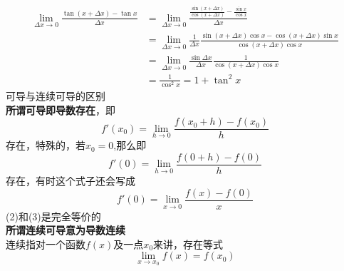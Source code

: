 \documentclass[UTF8]{ctexart}
\begin{document}
\begin{equation*}
    \begin{split}
        \lim_{\Delta x \to 0} \frac{\tan({x+\Delta x})-\tan{x}}{\Delta x}&=\lim_{\Delta x \to 0}\frac{\frac{\sin({x+\Delta x})}{\cos({x+\Delta x})}-\frac{\sin x }{\cos x} }{\Delta x} \\
        &=\lim_{\Delta x \to 0}\frac{1}{\Delta x}\frac{\sin({x+\Delta x})\cos{x}-\cos({x+\Delta x})\sin{x}}{\cos({x+\Delta x})\cos{x}}\\
        &=\lim_{\Delta x \to 0}\frac{\sin{\Delta x}}{\Delta x}\frac{1}{\cos({x+\Delta x})\cos x}\\
        &=\frac{1}{\cos^2 x}=1+\tan^2 x
    \end{split}
\end{equation*}
可导与连续可导的区别\\
\textbf{所谓可导即导数存在}，即
\begin{equation}
    f'(x_0)=\lim_{h \to 0}\frac{f(x_0+h)-f(x_0)}{h}
\end{equation}
存在，特殊的，若$x_0=0$,那么即
\begin{equation}
    f'(0)=\lim_{h \to 0}\frac{f(0+h)-f(0)}{h}
\end{equation}
存在，有时这个式子还会写成
\begin{equation}
    f'(0)=\lim_{x \to 0}\frac{f(x)-f(0)}{x}
\end{equation}
(2)和(3)是完全等价的\\
\textbf{所谓连续可导意为导数连续}\\
连续指对一个函数$f(x)$及一点$x_0$来讲，存在等式
\begin{equation}
    \lim_{x \to x_0}f(x)=f(x_0)
\end{equation}
\end{document}
